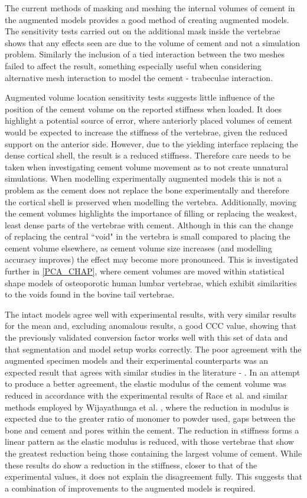 The current methods of masking and meshing the internal volumes of cement in
the augmented models provides a good method of creating augmented models. The
sensitivity tests carried out on the additional mask inside the vertebrae shows
that any effects seen are due to the volume of cement and not a simulation
problem. Similarly the inclusion of a tied interaction between the two meshes
failed to affect the result, something especially useful when considering
alternative mesh interaction to model the cement - trabeculae interaction.

Augmented volume location sensitivity tests suggests little influence of the
position of the cement volume on the reported stiffness when loaded.  It does
highlight a potential source of error, where anteriorly placed volumes of
cement would be expected to increase the stiffness of the vertebrae, given the
reduced support on the anterior side.  However, due to the yielding interface
replacing the dense cortical shell, the result is a reduced stiffness.
Therefore care needs to be taken when investigating cement volume movement as
to not create unnatural simulations.  When modelling experimentally augmented
models this is not a problem as the cement does not replace the bone
experimentally and therefore the cortical shell is preserved when modelling the
vertebra.  Additionally, moving the cement volumes highlights the importance of
filling or replacing the weakest, least dense parts of the vertebrae with
cement.  Although in this can the change of replacing the central ``void" in
the vertebra is small compared to placing the cement volume elsewhere, as
cement volume size increases (and modelling accuracy improves) the effect may
become more pronounced.  This is investigated further in \cref{PCA_CHAP}, where
cement volumes are moved within statistical shape models of osteoporotic human
lumbar vertebrae, which exhibit similarities to the voids found in the bovine
tail vertebrae.

The intact models agree well with experimental results, with very similar
results for the mean and, excluding anomalous results, a good CCC value,
showing that the previously validated conversion factor works well with this
set of data and that segmentation and model setup works correctly. The poor
agreement with the augmented specimen models and their experimental
counterparts was an expected result that agrees with similar studies in the
literature - \cite{Wijayathunga2008}. In an attempt to produce a better
agreement, the elastic modulus of the cement volume was reduced in accordance
with the experimental results of Race et al. \cite{Race2007} and similar
methods employed by Wijayathunga et al. \cite{Wijayathunga2008}, where the
reduction in modulus is expected due to the greater ratio of monomer to powder
used, gaps between the bone and cement and pores within the cement. The
reduction in stiffness forms a linear pattern as the elastic modulus is
reduced, with those vertebrae that show the greatest reduction being those
containing the largest volume of cement. While these results do show a
reduction in the stiffness, closer to that of the experimental values, it does
not explain the disagreement fully. This suggests that a combination of
improvements to the augmented models is required.

